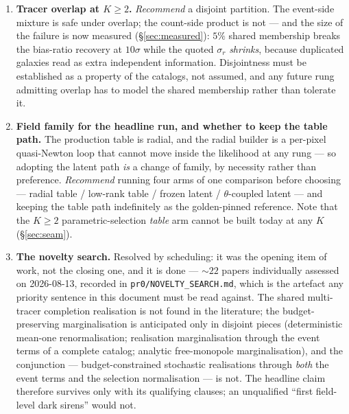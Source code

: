 \documentclass[11pt]{article}
\theoremstyle{definition}
\theoremstyle{remark}
\begin{document}
\begin{enumerate}[leftmargin=2.0em,itemsep=3pt]
\item[\bf D9.] \textbf{Tracer overlap at $K\ge2$.} \emph{Recommend} a disjoint
partition. The event-side mixture is safe under overlap; the count-side product is
not --- and the size of the failure is now measured (\S\ref{sec:measured}): $5\%$
shared membership breaks the bias-ratio recovery at $10\sigma$ while the quoted
$\sigma_r$ \emph{shrinks}, because duplicated galaxies read as extra independent
information. Disjointness must be established as a property of the catalogs, not
assumed, and any future rung admitting overlap has to model the shared
membership rather than tolerate it.

\item[\bf D10.] \textbf{Field family for the headline run, and whether to keep the
table path.} The production table is radial, and the radial builder is a per-pixel
quasi-Newton loop that cannot move inside the likelihood at any rung --- so adopting
the latent path \emph{is} a change of family, by necessity rather than preference.
\emph{Recommend} running four arms of one comparison before choosing --- radial table
/ low-rank table / frozen latent / $\theta$-coupled latent --- and keeping the table
path indefinitely as the golden-pinned reference. Note that the $K\ge2$
parametric-selection \emph{table} arm cannot be built today at any $K$
(\S\ref{sec:seam}).

\item[\bf D11.] \textbf{The novelty search.} Resolved by scheduling: it was the
opening item of work, not the closing one, and it is done ---
$\sim22$ papers individually assessed on 2026-08-13,
recorded in \texttt{pr0/NOVELTY\_SEARCH.md}, which is the artefact any priority
sentence in this document must be read against.
The shared multi-tracer completion realisation is not found in the literature;
the budget-preserving marginalisation is anticipated only in disjoint pieces
(deterministic mean-one renormalisation; realisation marginalisation through the
event terms of a complete catalog; analytic free-monopole marginalisation), and
the conjunction --- budget-constrained stochastic realisations through
\emph{both} the event terms and the selection normalisation --- is not. The
headline claim therefore survives only with its qualifying clauses; an
unqualified ``first field-level dark sirens'' would not.


\end{enumerate}
\end{document}
